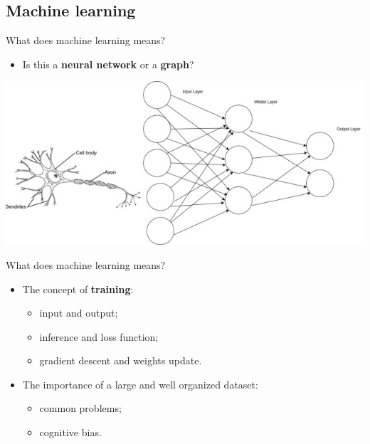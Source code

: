 \documentclass{beamer}
\begin{document}
\subsection{Machine learning}

\begin{frame}{What does machine learning means?}
	\begin{itemize}
		[triangle]
  		\item
    			Is this a \textbf{neural network} or a \textbf{graph}?
	\end{itemize}
	\includegraphics[scale=0.5]{neuralNet}
\end{frame}

\begin{frame}{What does machine learning means?}
	\begin{itemize}
		\setlength\itemsep{1em}
		[triangle]
  		\item 
			The concept of \textbf{training}:
    			\begin{itemize}
				[circle]
    				\item
      					input and output;
    				\item    
      					inference and loss function;
   				\item
					gradient descent and weights update.
			\end{itemize}
		\item
    			The importance of a large and well organized dataset:
    			\begin{itemize}
				[circle]
   				\item 
					common problems;
    				\item 
					cognitive bias.
    			\end{itemize}
 	 \end{itemize}
\end{frame}
\end{document}
